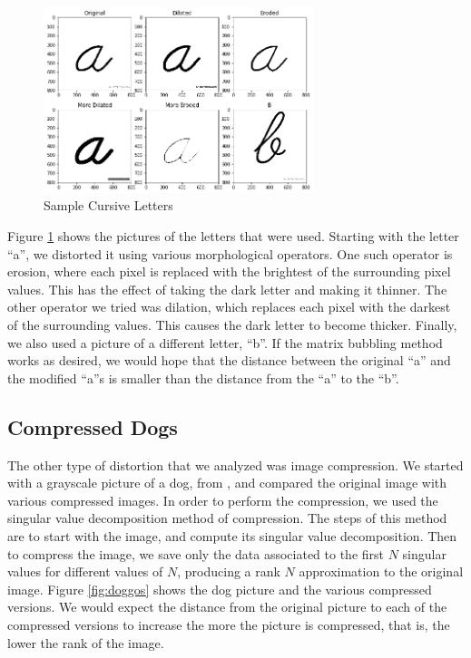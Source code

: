 \documentclass{article}
\begin{document}
\begin{figure}[h!]
\begin{center}
\includegraphics[width=0.7\textwidth]{a.png}
\caption{Sample Cursive Letters}
\label{fig:letters}
\end{center}
\end{figure}

Figure \ref{fig:letters} shows the pictures of the letters that were used.
Starting with the letter ``a'', we distorted it using various morphological
operators.\cite{morph}\cite{dilation} One such operator is erosion, where each
pixel is replaced with the brightest of the surrounding pixel values. This has
the effect of taking the dark letter and making it thinner. The other operator
we tried was dilation, which replaces each pixel with the darkest of the
surrounding values. This causes the dark letter to become thicker. Finally, we
also used a picture of a different letter, ``b''. If the matrix bubbling method
works as desired, we would hope that the distance between the original ``a''
and the modified ``a''s is smaller than the distance from the ``a'' to the
``b''.

\subsection{Compressed Dogs}

The other type of distortion that we analyzed was image compression. We started
with a grayscale picture of a dog, from \cite{doggo}, and compared the original
image with various compressed images. In order to perform the compression, we
used the singular value decomposition method of compression. The steps of this
method are to start with the image, and compute its singular value
decomposition. Then to compress the image, we save only the data associated to
the first $N$ singular values for different values of $N$, producing a rank $N$
approximation to the original image. Figure \ref{fig:doggos} shows the dog
picture and the various compressed versions. We would expect the distance from
the original picture to each of the compressed versions to increase the more
the picture is compressed, that is, the lower the rank of the image.
\end{document}
